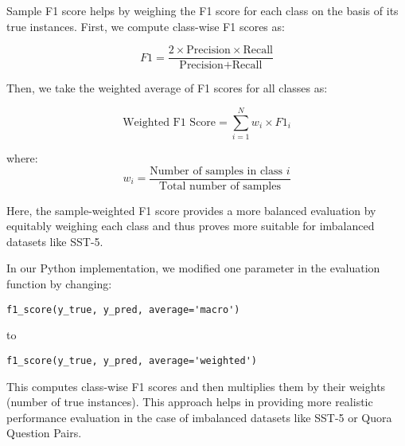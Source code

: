 Sample F1 score helps by weighing the F1 score for each class on the basis of its true instances. First, we compute class-wise F1 scores as:

\[
F1 = \frac{2 \times \text{Precision} \times \text{Recall}}{\text{Precision} + \text{Recall}}
\]

Then, we take the weighted average of F1 scores for all classes as:

\[
\text{Weighted F1 Score} = \sum_{i=1}^{N} w_i \times F1_i
\]

\noindent where:
\[
w_i = \frac{\text{Number of samples in class } i}{\text{Total number of samples}}
\]

Here, the sample-weighted F1 score provides a more balanced evaluation by equitably weighing each class and thus proves more suitable for imbalanced datasets like SST-5.

In our Python implementation, we modified one parameter in the evaluation function by changing:

\begin{verbatim}
f1_score(y_true, y_pred, average='macro')
\end{verbatim}

to

\begin{verbatim}
f1_score(y_true, y_pred, average='weighted')
\end{verbatim}

This computes class-wise F1 scores and then multiplies them by their weights (number of true instances). This approach helps in providing more realistic performance evaluation in the case of imbalanced datasets like SST-5 or Quora Question Pairs.